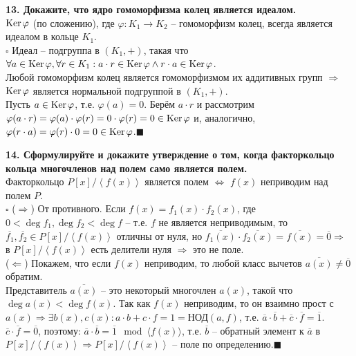 \documentclass[11pt,a4paper]{article}
\newcommand{\Ker}[1]{\mathrm{Ker}\hspace{0.5mm}#1}
\newcommand{\proof}{$\square$ }
\newcommand{\qed}{\hfill$\blacksquare$}
\begin{document}
\textbf{13. Докажите, что ядро гомоморфизма колец является идеалом.\\}
$\Ker{\varphi}$ (по сложению), где $\varphi : K_1 \rightarrow K_2$ -- гомоморфизм колец, всегда является идеалом в кольце $K_1$.\\
\proof Идеал -- подгруппа в $\left( K_1, + \right)$, такая что $\forall a \in \Ker{\varphi}, \forall r \in K_1: a \cdot r \in \Ker{\varphi} \wedge r \cdot a \in \Ker{\varphi}$.\\
Любой гомоморфизм колец является гомоморфизмом их аддитивных групп $\Rightarrow$ $\Ker{\varphi}$ является нормальной подгруппой в $\left( K_1, + \right)$.\\
Пусть $a \in \Ker{\varphi}$, т.е. $\varphi (a) = 0$. Берём $a \cdot r$ и рассмотрим $\varphi (a \cdot r) = \varphi (a) \cdot \varphi (r) = 0 \cdot \varphi (r) = 0 \in \Ker{\varphi}$ и, аналогично, $\varphi (r \cdot a) = \varphi (r) \cdot 0 = 0 \in \Ker{\varphi}$.\qed

\textbf{14. Сформулируйте и докажите утверждение о том, когда факторкольцо кольца многочленов над полем само является полем.\\}
Факторкольцо $P[x] / \left\langle f(x) \right\rangle$ является полем $\Leftrightarrow$ $f(x)$ неприводим над полем $P$.\\
\proof ($\Rightarrow$) От противного. Если $f(x) = f_1(x) \cdot f_2(x)$, где $0 < \deg f_1, \deg f_2 < \deg f$ -- т.е. $f$ не является неприводимым, то $\overline{f_1}, \overline{f_2} \in P[x] / \left\langle f(x) \right\rangle$ отличны от нуля, но $\overline{f_1(x)} \cdot \overline{f_2(x)} = \overline{f(x)} = \overline{0} \Rightarrow$ в $P[x] / \left\langle f(x) \right\rangle$ есть делители нуля $\Rightarrow$ это не поле.\\
($\Leftarrow$) Покажем, что если $f(x)$ неприводим, то любой класс вычетов $\overline{a(x)} \neq \overline{0}$ обратим.\\
Представитель $\overline{a(x)}$ -- это некоторый многочлен $a(x)$, такой что $\deg a(x) < \deg f(x)$. Так как $f(x)$ неприводим, то он взаимно прост с $a(x) \Rightarrow \exists b(x), c(x): a \cdot b + c \cdot f = 1 = \mathrm{\text{НОД}}(a, f)$, т.е. $\overline{a} \cdot \overline{b} + \overline{c} \cdot \overline{f} = \overline{1}$. $\overline{c} \cdot \overline{f} = \overline{0}$, поэтому: $\overline{a} \cdot \overline{b} = \overline{1} \mod \langle f(x) \rangle$, т.е. $\overline{b}$ -- обратный элемент к $\overline{a}$ в $P[x] / \left\langle f(x) \right\rangle \Rightarrow P[x] / \left\langle f(x) \right\rangle$ -- поле по определению.\qed
\end{document}
